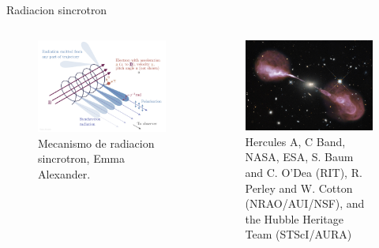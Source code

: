 \documentclass[xetex,aspectratio=169]{beamer}
\begin{document}
	\begin{frame}{Radiacion sincrotron}
		\begin{columns}
			
			\begin{column}{0.48\textwidth}
				\begin{figure}
					\includegraphics[width=\textwidth, keepaspectratio]{./figures/synchrotron/synchrotron.png}
					\caption{Mecanismo de radiacion sincrotron, Emma Alexander.}
				\end{figure}
			\end{column}
			
			\begin{column}{0.48\textwidth}
				\begin{figure}
					\includegraphics[width=\textwidth, keepaspectratio]{./figures/synchrotron/hercA.jpg}
					\caption{Hercules A, C Band, NASA, ESA, S. Baum and C. O'Dea (RIT), R. Perley and W. Cotton (NRAO/AUI/NSF), and the Hubble Heritage Team (STScI/AURA)}
				\end{figure}
				
				
			\end{column}
		\end{columns}
	\end{frame}
\end{document}
